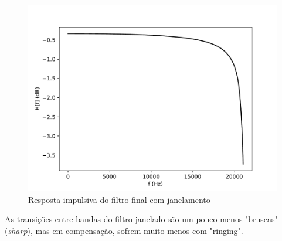 \begin{figure}[H]
    \centering
    \includegraphics[scale=0.5]{fig/windowed.pdf}
    \caption{Resposta impulsiva do filtro final com janelamento}
    \label{fig:impulsiva window}
\end{figure}

As transições entre bandas do filtro janelado são um pouco menos "bruscas" (\textit{sharp}), mas em compensação, sofrem muito menos com "ringing".

